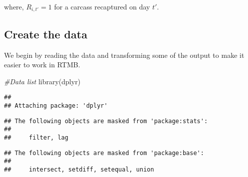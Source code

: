 \documentclass[
]{article}
\newenvironment{Shaded}{\begin{snugshade}}{\end{snugshade}}
\newcommand{\CommentTok}[1]{\textcolor[rgb]{0.56,0.35,0.01}{\textit{#1}}}
\newcommand{\FunctionTok}[1]{\textcolor[rgb]{0.00,0.00,0.00}{#1}}
\newcommand{\NormalTok}[1]{#1}
\begin{document}
where, \(R_{i,t\prime} = 1\) for a carcass recaptured on day
\(t\prime\).

\hypertarget{create-the-data}{%
\subsection{Create the data}\label{create-the-data}}

We begin by reading the data and transforming some of the output to make
it easier to work in RTMB.

\begin{Shaded}
\begin{Highlighting}[]
\CommentTok{\#Data list}
\FunctionTok{library}\NormalTok{(dplyr)}
\end{Highlighting}
\end{Shaded}

\begin{verbatim}
## 
## Attaching package: 'dplyr'
\end{verbatim}

\begin{verbatim}
## The following objects are masked from 'package:stats':
## 
##     filter, lag
\end{verbatim}

\begin{verbatim}
## The following objects are masked from 'package:base':
## 
##     intersect, setdiff, setequal, union
\end{verbatim}
\end{document}
